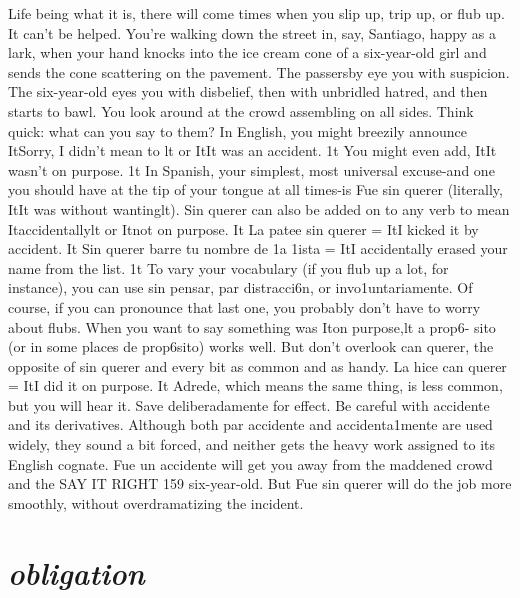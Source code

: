 {{{{%
Life being what it is, there will come times when you slip up,
trip up, or flub up. It can't be helped. You're walking down the street
in, say, Santiago, happy as a lark, when your hand knocks into the ice
cream cone of a six-year-old girl and sends the cone scattering on the
pavement. The passersby eye you with suspicion. The six-year-old eyes
you with disbelief, then with unbridled hatred, and then starts to bawl.
You look around at the crowd assembling on all sides. Think quick:
what can you say to them?
In English, you might breezily announce ItSorry, I didn't mean
to lt or ItIt was an accident. 1t You might even add, ItIt wasn't on purpose. 1t In Spanish, your simplest, most universal excuse-and one you
should have at the tip of your tongue at all times-is Fue sin querer
(literally, ItIt was without wantinglt). Sin querer can also be added on
to any verb to mean Itaccidentallylt or Itnot on purpose. It La patee sin
querer = ItI kicked it by accident. It Sin querer barre tu nombre de 1a
1ista = ItI accidentally erased your name from the list. 1t To vary your
vocabulary (if you flub up a lot, for instance), you can use sin pensar,
par distracci6n, or invo1untariamente. Of course, if you can pronounce
that last one, you probably don't have to worry about flubs.
When you want to say something was Iton purpose,lt a prop6-
sito (or in some places de prop6sito) works well. But don't overlook
can querer, the opposite of sin querer and every bit as common and
as handy. La hice can querer = ItI did it on purpose. It Adrede, which
means the same thing, is less common, but you will hear it. Save deliberadamente for effect.
Be careful with accidente and its derivatives. Although both
par accidente and accidenta1mente are used widely, they sound a bit
forced, and neither gets the heavy work assigned to its English cognate.
Fue un accidente will get you away from the maddened crowd and the
SAY IT RIGHT 159
six-year-old. But Fue sin querer will do the job more smoothly, without overdramatizing the incident.

\section{\emph{obligation}}

}}}}
